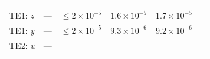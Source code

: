 \documentclass[DM,toc]{lsstdoc}
\begin{document}
\begin{longtable}[]{@{}llllll@{}}
\begin{minipage}[t]{0.17\columnwidth}
\strut
\end{minipage}\tabularnewline
\begin{minipage}[t]{0.12\columnwidth}\raggedright\strut
TE1: \emph{z}\strut
\end{minipage} & \begin{minipage}[t]{0.06\columnwidth}\raggedright\strut
---\strut
\end{minipage} & \begin{minipage}[t]{0.14\columnwidth}\raggedright\strut
\(\leq 2\times10^{-5}\)\strut
\end{minipage} & \begin{minipage}[t]{0.12\columnwidth}\raggedright\strut
\(1.6\times10^{-5}\) \strut
\end{minipage} & \begin{minipage}[t]{0.12\columnwidth}\raggedright\strut
\(1.7\times10^{-5}\)\strut
\end{minipage} & \begin{minipage}[t]{0.17\columnwidth}\raggedright\strut
\strut
\end{minipage}\tabularnewline
\begin{minipage}[t]{0.12\columnwidth}\raggedright\strut
TE1: \emph{y}\strut
\end{minipage} & \begin{minipage}[t]{0.06\columnwidth}\raggedright\strut
---\strut
\end{minipage} & \begin{minipage}[t]{0.14\columnwidth}\raggedright\strut
\(\leq 2\times10^{-5}\)\strut
\end{minipage} & \begin{minipage}[t]{0.12\columnwidth}\raggedright\strut
\(9.3\times10^{-6}\)\strut
\end{minipage} & \begin{minipage}[t]{0.12\columnwidth}\raggedright\strut
\(9.2\times10^{-6}\)\strut
\end{minipage} & \begin{minipage}[t]{0.17\columnwidth}\raggedright\strut
\strut
\end{minipage}\tabularnewline
\begin{minipage}[t]{0.12\columnwidth}\raggedright\strut
TE2: \emph{u}\strut
\end{minipage} & \begin{minipage}[t]{0.06\columnwidth}\raggedright\strut
---\strut
\end{minipage} & \begin{minipage}[t]{0.14\columnwidth}\raggedright\strut

\end{minipage}
\end{longtable}
\end{document}
